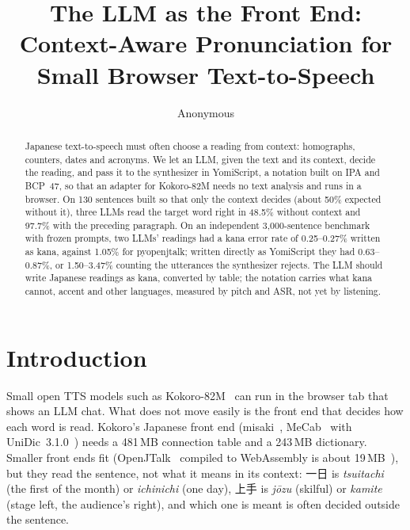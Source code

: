 \documentclass{Interspeech}
\title{The LLM as the Front End: Context-Aware Pronunciation for Small Browser Text-to-Speech}
\author[affiliation={1}]{Anonymous}{Author}
\begin{document}
\maketitle

\begin{abstract}
Japanese text-to-speech must often choose a reading from context: homographs, counters, dates and acronyms. We let
an LLM, given the text and its context, decide the reading, and pass it to the synthesizer in YomiScript, a notation
built on IPA and BCP~47, so that an adapter for Kokoro-82M needs no text analysis and runs in a browser. On 130
sentences built so that only the context decides (about 50\% expected without it), three LLMs read the
target word right in 48.5\% without context and 97.7\% with the preceding paragraph. On an independent 3{,}000-sentence
benchmark with frozen prompts, two LLMs' readings had a kana error rate of 0.25--0.27\% written as kana, against
1.05\% for pyopenjtalk; written directly as YomiScript they had 0.63--0.87\%, or 1.50--3.47\% counting the utterances
the synthesizer rejects. The LLM should write Japanese readings as kana, converted by table; the notation carries what
kana cannot, accent and other languages, measured by pitch and ASR, not yet by listening.
\end{abstract}

\section{Introduction}

Small open TTS models such as Kokoro-82M~\cite{kokoro82m} can run in the browser tab that shows an LLM chat. What does
not move easily is the front end that decides how each word is read. Kokoro's Japanese front end
(misaki~\cite{misaki}, MeCab~\cite{kudo2004mecab} with UniDic~3.1.0~\cite{den2008unidic}) needs a 481\,MB connection table
and a 243\,MB dictionary. Smaller front ends fit (OpenJTalk~\cite{openjtalk} compiled to WebAssembly is about
19\,MB~\cite{piperplus}), but they read the sentence, not what it means in its context: 一日 is \emph{tsuitachi} (the
first of the month) or \emph{ichinichi} (one day), 上手 is \emph{jōzu} (skilful) or \emph{kamite} (stage left, the audience's right), and
which one is meant is often decided outside the sentence.
\end{document}
